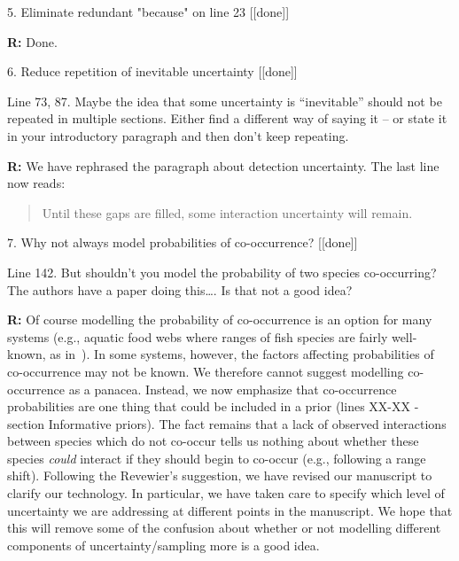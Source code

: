 \documentclass[12pt]{letter}
\newenvironment{refquote}{\bigskip \begin{it}}{\end{it}\smallskip}
\begin{document}
	5. Eliminate redundant "because" on line 23 [[done]]

		\textbf{R:} Done.


	6. Reduce repetition of inevitable uncertainty [[done]]

		\begin{refquote}
		Line 73, 87.  Maybe the idea that some uncertainty is “inevitable” should not be repeated in multiple sections.  Either find a different way of saying it – or state it in your introductory paragraph and then don’t keep repeating.
		\end{refquote}

		\textbf{R:} We have rephrased the paragraph about detection uncertainty. The last line now reads:
			
			\begin{quotation}

				Until these gaps are filled, some interaction uncertainty will remain.

			\end{quotation}


	7. Why not always model probabilities of co-occurrence? [[done]]

		\begin{refquote}
		Line 142.  But shouldn’t you model the probability of two species co-occurring?  The authors have a paper doing this…. Is that not a good idea?
		\end{refquote}

		\textbf{R:} Of course modelling the probability of co-occurrence is an option for many systems (e.g., aquatic food webs where ranges of fish species are fairly well-known, as in~\citet{Gravel2013}). In some systems, however, the factors affecting probabilities of co-occurrence may not be known. We therefore cannot suggest modelling co-occurrence as a panacea. Instead, we now emphasize that co-occurrence probabilities are one thing that could be included in a prior (lines XX-XX - section Informative priors). 
		\smallskip
		The fact remains that a lack of observed interactions between species which do not co-occur tells us nothing about whether these species \emph{could} interact if they should begin to co-occur (e.g., following a range shift). Following the Revewier's suggestion, we have revised our manuscript to clarify our technology. In particular, we have taken care to specify which level of uncertainty we are addressing at different points in the manuscript. We hope that this will remove some of the confusion about whether or not modelling different components of uncertainty/sampling more is a good idea. 
\end{document}
